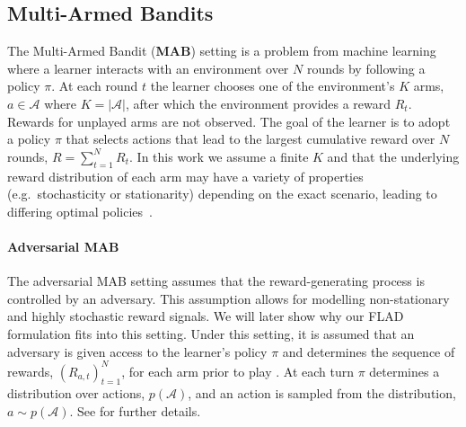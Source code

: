 \subsection{Multi-Armed Bandits}

The Multi-Armed Bandit (\textbf{MAB}) setting is a problem from machine learning where a learner interacts with an environment over $N$ rounds by following a policy $\pi$. At each round $t$ the learner chooses one of the environment's $K$ arms, $a\in\mathcal{A}$ where $K=\vert\mathcal{A}\vert$, after which the environment provides a reward $R_{t}$. Rewards for unplayed arms are not observed. The goal of the learner is to adopt a policy $\pi$ that selects actions that lead to the largest cumulative reward over $N$ rounds, $R=\sum_{t=1}^{N}R_{t}$.
In this work we assume a finite $K$ and that the underlying reward distribution of each arm may have a variety of properties (e.g.\ stochasticity or stationarity) depending on the exact scenario, leading to differing optimal policies~\citep{lattimore_szepesvári_2020}.

\paragraph{Adversarial MAB}
The adversarial MAB setting assumes that the reward-generating process is controlled by an adversary. This assumption allows for modelling non-stationary and highly stochastic reward signals.
We will later show why our FLAD formulation fits into this setting.
Under this setting, it is assumed that an adversary is given access to the learner's policy $\pi$ and determines the sequence of rewards, $(R_{a,t})_{t=1}^{N}$, for each arm prior to play \citep{auer1995gambling}. At each turn $\pi$ determines a distribution over actions, $p(\mathcal{A})$, and an action is sampled from the distribution, $a\sim p(\mathcal{A})$.
See \citet{lattimore_szepesvári_2020} for further details.

